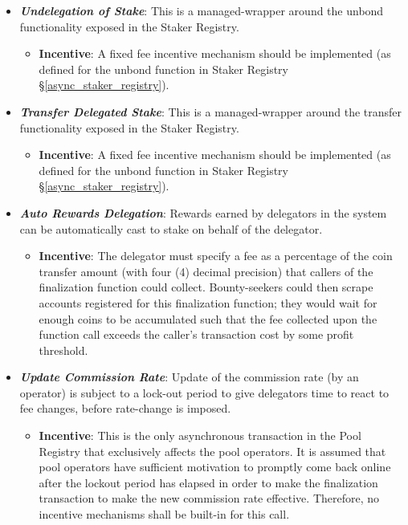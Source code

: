 \begin{itemize}
    \item \textit{\textbf{Undelegation of Stake}}: This is a managed-wrapper around the unbond functionality exposed in the Staker Registry. 
    \begin{itemize}[label=--,nosep]
        \item \textbf{Incentive}: A fixed fee incentive mechanism should be implemented (as defined for the unbond function in Staker Registry \S\ref{async_staker_registry}). 
    \end{itemize}
    
    \item \textit{\textbf{Transfer Delegated Stake}}: This is a managed-wrapper around the transfer functionality exposed in the Staker Registry. 
    \begin{itemize}[label=--,nosep]
        \item \textbf{Incentive}: A fixed fee incentive mechanism should be implemented (as defined for the unbond function in Staker Registry \S\ref{async_staker_registry}). 
    \end{itemize}
    
    \item \textit{\textbf{Auto Rewards Delegation}}: Rewards earned by delegators in the system can be automatically cast to stake on behalf of the delegator. 
    \begin{itemize}[label=--,nosep]
        \item \textbf{Incentive}: The delegator must specify a fee as a percentage of the coin transfer amount (with four (4) decimal precision) that callers of the finalization function could collect. Bounty-seekers could then scrape accounts registered for this finalization function; they would wait for enough coins to be accumulated such that the fee collected upon the function call exceeds the caller's transaction cost by some profit threshold. 
    \end{itemize}
    
    \item \textit{\textbf{Update Commission Rate}}: Update of the commission rate (by an operator) is subject to a lock-out period to give delegators time to react to fee changes, before rate-change is imposed. 
    \begin{itemize}[label=--,nosep]
        \item \textbf{Incentive}: This is the only asynchronous transaction in the Pool Registry that exclusively affects the pool operators. It is assumed that pool operators have sufficient motivation to promptly come back online after the lockout period has elapsed in order to make the finalization transaction to make the new commission rate effective. Therefore, no incentive mechanisms shall be built-in for this call. 
    \end{itemize}
\end{itemize}


